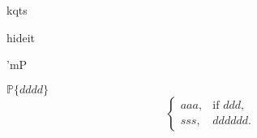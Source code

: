 kqts

hideit

'mP

$\mathbb{P}\{dddd\}$
\[
    \begin{cases}
        aaa, & \text{if } ddd, \\
        sss, & dddddd .
    \end{cases}
\] 
